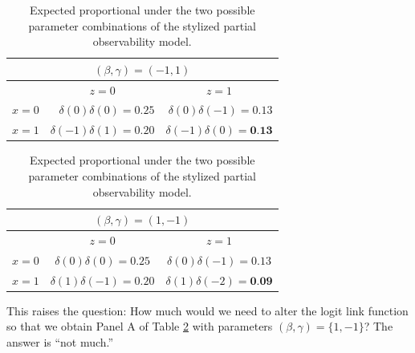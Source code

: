 \documentclass[10pt]{article}
\begin{document}
\begin{table}[h]
    \begin{subtable}{.5\linewidth}
      \centering
        \caption{}
\begin{tabular}{crr}
\multicolumn{3}{c}{$(\beta, \gamma) = (-1, 1)$}\\ \hline
 & \multicolumn{1}{c}{$z = 0$} & \multicolumn{1}{c}{$z = 1$}\\
$x = 0$ & $\delta(0)\delta(0) = 0.25$ & $\delta(0)\delta(-1) = 0.13$\\
$x = 1$ & $\delta(-1)\delta(1) = 0.20$ & $\delta(-1)\delta(0) = \textbf{0.13}$\\\hline
\end{tabular}
    \end{subtable}%
    \begin{subtable}{.5\linewidth}
      \centering
        \caption{}
\begin{tabular}{ccc}
\multicolumn{3}{c}{$(\beta, \gamma) = (1, -1)$}\\ \hline
 & \multicolumn{1}{c}{$z = 0$} & \multicolumn{1}{c}{$z = 1$}\\
$x = 0$ & $\delta(0)\delta(0) = 0.25$ & $\delta(0)\delta(-1) = 0.13$\\
$x = 1$ & $\delta(1)\delta(-1) = 0.20$ & $\delta(1)\delta(-2) = \textbf{0.09}$\\\hline
\end{tabular}
    \end{subtable} 
        \caption{Expected proportional under the two possible parameter combinations of the stylized partial observability model.}\label{tab:ep}
\end{table}

This raises the question: How much would we need to alter the logit link function so that we obtain Panel A of Table \ref{tab:ep} with parameters $(\beta, \gamma) = \{1, -1\}$? The answer is ``not much.''
\end{document}
